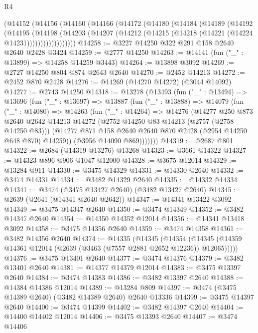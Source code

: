 \begin{lexlean}{R4}
\begin{coremodule}
    (@14152
      (@14156
        (@14160
          (@14166
            (@14172
              (@14180
                (@14184
                  (@14189
                    (@14192
                      (@14195
                        (@14198
                          (@14203
                            (@14207 (@14212 (@14215 (@14218 (@14221 (@14224 @14231))))))))))))))))))
@14258 := @3227 @14250 @322 @291 @158 @2640 @2640 @2428 @3424
@14259 := @2777 @14250
@14263 := @14141 (fun ("_" : @13899) => @14258 @14259 @3443)
@14264 := @13898 @3092
@14269 := @2727 @14250 @804 @874 @2643 @2640
@14270 := @2452 @14213
@14272 := @2452 @870 @2428
@14276 := @14269 (@14270 @14272) (@3044 @14092)
@14277 := @2743 @14250
@14318 := @13278
    (@13493
      (fun ("_" : @13494) =>
      @13696
        (fun ("_" : @13697) =>
        @13887
          (fun ("_" : @13888) =>
          @14079
            (fun ("_" : @14080) =>
            @14263
              (fun ("_" : @14264) =>
              @14276
                (@14277
                  @250
                  @873
                  @2640
                  @2642
                  @14213
                  @14272
                  (@2752 @14250 @83 @14213 (@2757 (@2758 @14250 @83)))
                  (@14277 @871 @158 @2640 @2640 @870 @2428 (@2954 @14250 @648 @870) @14259))
                (@3956 @14090 @869)))))))
@14319 := @2687 @801
@14322 := @2684 (@14319 @13276) @13268
@14323 := @3661 @14322
@14327 := @14323 @896 @906 @1047 @12000
@14328 := @3675 @12014
@14329 := @13284 @911
@14330 := @3475 @14329
@14331 := @14330 @2640
@14332 := @3474 @14331
@14334 := @3482 @14329 @2640
@14335 := @14332 @14334
@14341 := @3474 (@3475 @13427 @2640) (@3482 @13427 @2640)
@14345 := @2639 (@2641 (@14341 @2640 @2642))
@14347 := @14341 @13422 @3092
@14349 := @3475 @14347 @2640
@14350 := @3474 @14349
@14352 := @3482 @14347 @2640
@14354 := @14350 @14352 @12014
@14356 := @14341 @13418 @3092
@14358 := @3475 @14356 @2640
@14359 := @3474 @14358
@14361 := @3482 @14356 @2640
@14374 := @14335
    (@14345
      (@14354 (@14345 (@14359 @14361 @12014 (@2639 (@3463 (@7557 @2881 @2652 @12236)) @12065)))))
@14376 := @3475 @13401 @2640
@14377 := @3474 @14376
@14379 := @3482 @13401 @2640
@14381 := @14377 @14379 @12014
@14383 := @3475 @13397 @2640
@14384 := @3474 @14383
@14386 := @3482 @13397 @2640
@14388 := @14384 @14386 @12014
@14389 := @13284 @809
@14397 := @3474 (@3475 @14389 @2640) (@3482 @14389 @2640) @2640 @13336
@14399 := @3475 @14397 @2640
@14400 := @3474 @14399
@14402 := @3482 @14397 @2640
@14404 := @14400 @14402 @12014
@14406 := @3475 @13393 @2640
@14407 := @3474 @14406

\end{coremodule}
\end{lexlean}
